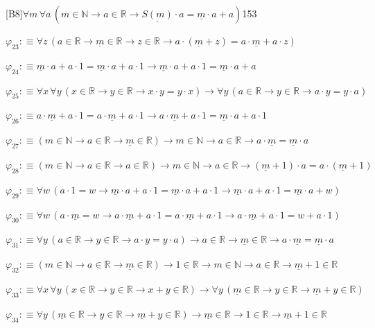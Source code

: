 \begin{fullproof}{[B8]}{$\forall m\,\forall a\,(m \in \mathbb{N} \to a \in \mathbb{R} \to \underline{S(m)} \cdot a = \underline{m} \cdot a + a)$}{153}
\begin{abbrevlist}
\item $\varphi_{23} :\equiv \forall z\,(a \in \mathbb{R} \to \underline{m} \in \mathbb{R} \to z \in \mathbb{R} \to a \cdot (\underline{m} + z) = a \cdot \underline{m} + a \cdot z)$
\item $\varphi_{24} :\equiv \underline{m} \cdot a + a \cdot 1 = \underline{m} \cdot a + a \cdot 1 \to \underline{m} \cdot a + a \cdot 1 = \underline{m} \cdot a + a$
\item $\varphi_{25} :\equiv \forall x\,\forall y\,(x \in \mathbb{R} \to y \in \mathbb{R} \to x \cdot y = y \cdot x) \to \forall y\,(a \in \mathbb{R} \to y \in \mathbb{R} \to a \cdot y = y \cdot a)$
\item $\varphi_{26} :\equiv a \cdot \underline{m} + a \cdot 1 = a \cdot \underline{m} + a \cdot 1 \to a \cdot \underline{m} + a \cdot 1 = \underline{m} \cdot a + a \cdot 1$
\item $\varphi_{27} :\equiv (m \in \mathbb{N} \to a \in \mathbb{R} \to \underline{m} \in \mathbb{R}) \to m \in \mathbb{N} \to a \in \mathbb{R} \to a \cdot \underline{m} = \underline{m} \cdot a$
\item $\varphi_{28} :\equiv (m \in \mathbb{N} \to a \in \mathbb{R} \to a \in \mathbb{R}) \to m \in \mathbb{N} \to a \in \mathbb{R} \to (\underline{m} + 1) \cdot a = a \cdot (\underline{m} + 1)$
\item $\varphi_{29} :\equiv \forall w\,(a \cdot 1 = w \to \underline{m} \cdot a + a \cdot 1 = \underline{m} \cdot a + a \cdot 1 \to \underline{m} \cdot a + a \cdot 1 = \underline{m} \cdot a + w)$
\item $\varphi_{30} :\equiv \forall w\,(a \cdot \underline{m} = w \to a \cdot \underline{m} + a \cdot 1 = a \cdot \underline{m} + a \cdot 1 \to a \cdot \underline{m} + a \cdot 1 = w + a \cdot 1)$
\item $\varphi_{31} :\equiv \forall y\,(a \in \mathbb{R} \to y \in \mathbb{R} \to a \cdot y = y \cdot a) \to a \in \mathbb{R} \to \underline{m} \in \mathbb{R} \to a \cdot \underline{m} = \underline{m} \cdot a$
\item $\varphi_{32} :\equiv (m \in \mathbb{N} \to a \in \mathbb{R} \to \underline{m} \in \mathbb{R}) \to 1 \in \mathbb{R} \to m \in \mathbb{N} \to a \in \mathbb{R} \to \underline{m} + 1 \in \mathbb{R}$
\item $\varphi_{33} :\equiv \forall x\,\forall y\,(x \in \mathbb{R} \to y \in \mathbb{R} \to x + y \in \mathbb{R}) \to \forall y\,(\underline{m} \in \mathbb{R} \to y \in \mathbb{R} \to \underline{m} + y \in \mathbb{R})$
\item $\varphi_{34} :\equiv \forall y\,(\underline{m} \in \mathbb{R} \to y \in \mathbb{R} \to \underline{m} + y \in \mathbb{R}) \to \underline{m} \in \mathbb{R} \to 1 \in \mathbb{R} \to \underline{m} + 1 \in \mathbb{R}$

\end{abbrevlist}
\end{fullproof}
